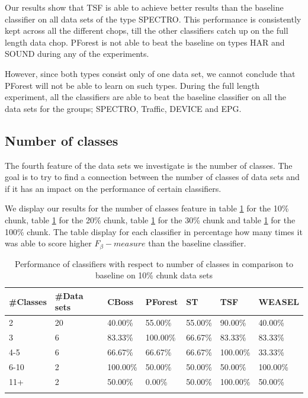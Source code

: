 Our results show that TSF is able to achieve better results than the baseline classifier on all data sets of the type SPECTRO.
This performance is consistently kept across all the different chops, till the other classifiers catch up on the full length data chop.
PForest is not able to beat the baseline on types HAR and SOUND during any of the experiments.

However, since both types consist only of one data set, we cannot conclude that PForest will not be able to learn on such types.
During the full length experiment, all the classifiers are able to beat the baseline classifier on all the data sets for the groups; SPECTRO, Traffic, DEVICE and EPG.


\subsection{Number of classes}
The fourth feature of the data sets we investigate is the number of classes.
The goal is to try to find a connection between the number of classes of data sets and if it has an impact on the performance of certain classifiers.

We display our results for the number of classes feature in table \ref{TableNumClass10} for the 10\% chunk, table \ref{TableNumClass10} for the 20\% chunk, table \ref{TableNumClass10} for the 30\% chunk and table \ref{TableNumClass10} for the 100\% chunk.
The table display for each classifier in percentage how many times it was able to score higher $F_{\beta}-measure$ than the baseline classifier.

\begin{table}[hbt!]
	\setlength\extrarowheight{2pt} %
	\begin{tabularx}{\textwidth}{|X|X|X|X|X|X|X|}
	\hline
	\textbf{\#Classes} & \textbf{\#Data sets} & \textbf{CBoss} & \textbf{PForest} & \textbf{ST} & \textbf{TSF} & \textbf{WEASEL} \\ \hline
		2 & 20 & 40.00\% & 55.00\% & 55.00\% & 90.00\% & 40.00\% \\ \hline
		3 & 6 & 83.33\% & 100.00\% & 66.67\% & 83.33\% & 83.33\% \\ \hline
		4-5 & 6 & 66.67\% & 66.67\% & 66.67\% & 100.00\% & 33.33\% \\ \hline
		6-10 & 2 & 100.00\% & 50.00\% & 50.00\% & 50.00\% & 100.00\% \\ \hline
		11+ & 2 & 50.00\% & 0.00\% & 50.00\% & 100.00\% & 50.00\% \\ \hline
  \caption{Performance of classifiers with respect to number of classes in comparison to baseline on 10\% chunk data sets}
  \label{TableNumClass10}
  \end{tabularx}
\end{table}

